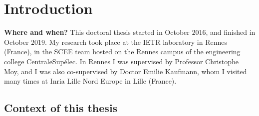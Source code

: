 
\chapter{Introduction}
\label{chapter:1}





\graphicspath{{2-Chapters/1-Chapter/Images/}}

\textbf{Where and when?}
%
This doctoral thesis started in October $2016$, and finished in October $2019$.
My research took place at the IETR laboratory in Rennes (France), in the SCEE team hosted on the Rennes campus of the engineering college CentraleSupélec.
In Rennes I was supervised by Professor Christophe Moy,
and I was also co-supervised by Doctor Emilie Kaufmann, whom I visited many times at Inria Lille Nord Europe in Lille (France).



\section{Context of this thesis}
\label{sec:1:problems}

